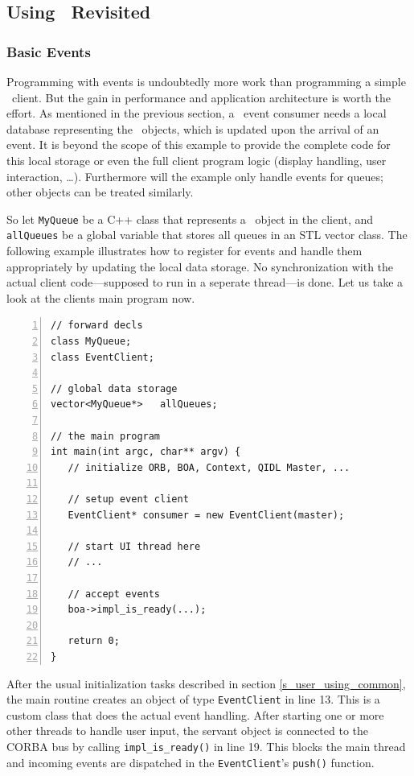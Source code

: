 \subsection{\label{s_user_using_qidl_rev}Using \qidl\ Revisited}
\subsubsection{Basic Events}
Programming with events is undoubtedly more work than programming a simple
\qidl\ client. But the gain in performance and application architecture is
worth the effort. As mentioned in the previous section, a \qidl\ event
consumer needs a local database representing the \codine\ objects, which is
updated upon the arrival of an event. It is beyond the scope of this example
to provide the complete code for this local storage or even the full client
program logic (display handling, user interaction, \dots). Furthermore will
the example only handle events for queues; other objects can be treated
similarly.

So let \texttt{MyQueue} be a C++ class that represents a \queue\ object in
the client, and \texttt{allQueues} be a global variable that stores all
queues in an STL vector class. The following example illustrates how to
register for events and handle them appropriately by updating the local data
storage. No synchronization with the actual client code---supposed to run in
a seperate thread---is done.
Let us take a look at the clients main program now. 

\begin{Verbatim}[frame=lines, numbers=left, fontsize=\small, framerule=1mm]
// forward decls
class MyQueue;
class EventClient;

// global data storage
vector<MyQueue*>   allQueues;

// the main program
int main(int argc, char** argv) {
   // initialize ORB, BOA, Context, QIDL Master, ...

   // setup event client
   EventClient* consumer = new EventClient(master);

   // start UI thread here
   // ...

   // accept events
   boa->impl_is_ready(...);

   return 0;
}
\end{Verbatim}

After the usual initialization tasks described in section 
\ref{s_user_using_common},
the main routine creates an object of type \texttt{EventClient} in line 13.
This is a custom class that does the actual event handling. After starting
one or more other threads to handle user input, the servant object is
connected to the CORBA bus by calling \texttt{impl\_is\_ready()} in line 19.
This blocks the main thread and incoming events are dispatched in the
\texttt{EventClient}'s \texttt{push()} function.

